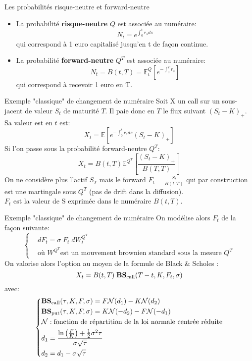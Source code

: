 \documentclass{beamer}
\begin{document}
\begin{frame}{Les probabilités risque-neutre et forward-neutre}
\begin{itemize}
\item La probabilité \textbf{risque-neutre} $Q$ est associée au numéraire:
\[
N_t=e^{\int_0^t r_s ds }
\]
qui correspond à 1 euro capitalisé jusqu'en t de façon continue.
\vspace{0.5cm}\\
\item La probabilité \textbf{forward-neutre} $Q^T$ est associée au numéraire:
\[
N_t=B(t,T)=\mathbb{E}^Q_t[e^{-\int_0^T r_s}]
\]
qui correspond à recevoir 1 euro en T.
\end{itemize}

\end{frame}

\begin{frame}{Exemple "classique" de changement de numéraire}
Soit X un call sur un sous-jacent de valeur $S_t$ de maturité $T$. Il paie donc en $T$ le flux suivant $(S_t-K)_+$.\\
Sa valeur est en $t$ est:
\[
X_t=\mathbb{E}[e^{-\int_0^t r_s ds}(S_t-K)_+]
\]
Si l'on passe sous la probabilité forward-neutre $Q^T$:
\[
X_t=B(t,T)\mathbb{E}^{Q^T}\left[\frac{(S_t-K)_+}{B(T,T)}\right]
\]
On ne considère plus l'actif $S_T$ mais le forward $F_t=\frac{S_t}{B(t,T)}$  qui par construction est une martingale sous $Q^T$ (pas de drift dans la diffusion).\\
$F_t$ est la valeur de S exprimée dans le numéraire $B(t,T)$.
\end{frame}
\begin{frame}{Exemple "classique" de changement de numéraire}
On modélise alors $F_t$ de la façon suivante:
\[
\left\{
\begin{split}
&dF_t=\sigma\; F_t \;dW_t^{Q^T}\\
&\text{où } W^{Q^T}\text{est un mouvement brownien standard sous la mesure }Q^T
\end{split}
\right.
\]
On valorise alors l'option au moyen de la formule de Black \& Scholes :
\[
X_t=B(t,T)\;\text{\textbf{BS}}_\text{call}(T-t,K,F_t,\sigma)
\]
avec:
\[
\left\{
\begin{split}
&\text{\textbf{BS}}_\text{call}(\tau,K,F,\sigma)=F\mathcal{N}(d_1)-K \mathcal{N}(d_2)\\
&\text{\textbf{BS}}_\text{put}(\tau,K,F,\sigma)=K\mathcal{N}(-d_2)-F \mathcal{N}(-d_1)\\
&\mathcal{N} : \text{fonction de répartition de la loi normale centrée réduite}\\
&d_1=\frac{\ln\left(\frac{F}{K}\right)+\frac{1}{2}\sigma^2\tau}{\sigma\sqrt{\tau}}\\
&d_2=d_1-\sigma\sqrt{\tau}
\end{split}
\right.
\]
\end{frame}
\end{document}
